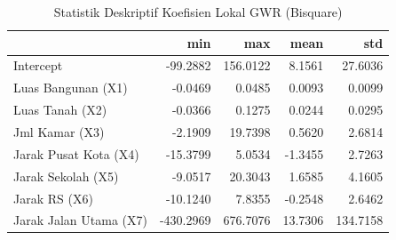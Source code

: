 \begin{table}[H]
\centering
\caption{Statistik Deskriptif Koefisien Lokal GWR (Bisquare)}
\label{tab:gwr_coef}
\footnotesize
\begin{tabular}{lrrrr}
\toprule
 & min & max & mean & std \\
\midrule
Intercept & -99.2882 & 156.0122 & 8.1561 & 27.6036 \\
Luas Bangunan (X1) & -0.0469 & 0.0485 & 0.0093 & 0.0099 \\
Luas Tanah (X2) & -0.0366 & 0.1275 & 0.0244 & 0.0295 \\
Jml Kamar (X3) & -2.1909 & 19.7398 & 0.5620 & 2.6814 \\
Jarak Pusat Kota (X4) & -15.3799 & 5.0534 & -1.3455 & 2.7263 \\
Jarak Sekolah (X5) & -9.0517 & 20.3043 & 1.6585 & 4.1605 \\
Jarak RS (X6) & -10.1240 & 7.8355 & -0.2548 & 2.6462 \\
Jarak Jalan Utama (X7) & -430.2969 & 676.7076 & 13.7306 & 134.7158 \\
\bottomrule
\end{tabular}
\end{table}
